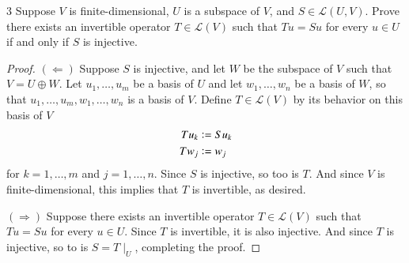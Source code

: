 \documentclass[11pt]{extarticle}
\newenvironment{problem}[1]{\begin{prob*}{#1}{}}{\end{prob*}}
\newcommand{\Hom}{\mathcal{L}}
\newcommand{\defeq}{\vcentcolon=}
\begin{document}
\begin{problem}{3}
Suppose $V$ is finite-dimensional, $U$ is a subspace of $V$, and $S\in\Hom(U,V)$.  Prove there exists an invertible operator $T\in\Hom(V)$ such that $Tu=Su$ for every $u\in U$ if and only if $S$ is injective.
\end{problem}
\begin{proof}
$(\Leftarrow)$ Suppose $S$ is injective, and let $W$ be the subspace of $V$ such that $V = U\oplus W$.  Let $u_1,\dots, u_m$ be a basis of $U$ and let $w_1,\dots, w_n$ be a basis of $W$, so that $u_1,\dots, u_m,w_1,\dots,w_n$ is a basis of $V$.  Define $T\in\Hom(V)$ by its behavior on this basis of $V$
\begin{align*}
Tu_k &\defeq Su_k\\
Tw_j &\defeq w_j
\end{align*}
for $k = 1,\dots, m$ and $j = 1,\dots, n$.  Since $S$ is injective, so too is $T$.  And since $V$ is finite-dimensional, this implies that $T$ is invertible, as desired.
\par $(\Rightarrow)$  Suppose there exists an invertible operator $T\in\Hom(V)$ such that $Tu=Su$ for every $u\in U$.  Since $T$ is invertible, it is also injective.  And since $T$ is injective, so to is $S = T\mid_U$, completing the proof.
\end{proof}
\end{document}
